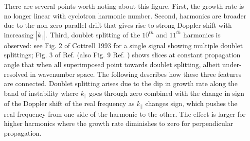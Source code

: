 \documentclass[12pt]{iopart}
\begin{document}
There are several points worth noting about this figure. First, the
growth rate is no longer linear with cyclotron harmonic number. Second,
harmonics are broader due to the non-zero parallel drift that gives rise to
strong Doppler shift with increasing $|k_\parallel|$. Third, doublet splitting
of the $10^{th}$ and $11^{th}$ harmonics is observed: see Fig. 2 of Cottrell 1993 for a single
signal showing multiple doublet splittings; Fig. 3 of Ref. \cite{Dendy1994} (also
Fig. 9 Ref. \cite{Dendy1995}) shows slices at constant propagation angle that when
all superimposed point towards doublet splitting, albeit under-resolved in
wavenumber space. The following describes how these three features are
connected. Doublet splitting arises due to the dip in growth rate along the 
band of instability where
$k_\parallel$ goes through zero combined with the change in sign of the Doppler
shift of the real frequency as $k_\parallel$ changes sign, which pushes the real
frequency from one side of the harmonic to the other. The effect is
larger for higher harmonics where the growth rate diminishes to zero for
perpendicular propagation.
\end{document}
